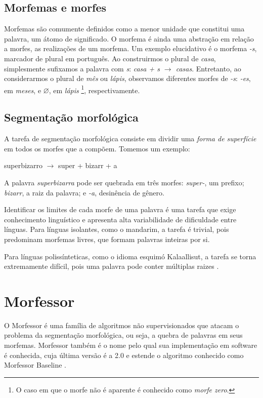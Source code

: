 \documentclass[cic,tc]{iiufrgs}
\begin{document}
\subsection{Morfemas e morfes}
Morfemas são comumente definidos como a menor unidade que constitui uma palavra, um átomo de significado. O morfema é ainda uma abstração em relação a morfes, as realizações de um morfema. Um exemplo elucidativo é o morfema \emph{-s}, marcador de plural em português. Ao construirmos o plural de \emph{casa}, simplesmente sufixamos a palavra com \emph{s}: \emph{casa + s $\rightarrow$ casas}. Entretanto, ao considerarmos o plural de \emph{mês} ou \emph{lápis}, observamos diferentes morfes de \emph{-s}: \emph{-es}, em \emph{meses}, e $\varnothing$, em \emph{lápis} \footnote{O caso em que o morfe não é aparente é conhecido como \emph{morfe zero}.}, respectivamente.

\subsection{Segmentação morfológica}
A tarefa de segmentação morfológica consiste em dividir uma \emph{forma de superfície} em todos os morfes que a compõem. Tomemos um exemplo:

\begin{center}
    superbizarro $\rightarrow$ super + bizarr + a
\end{center}

A palavra \emph{superbizarra} pode ser quebrada em três morfes: \emph{super-}, um prefixo; \emph{bizarr}, a raiz da palavra; e \emph{-a}, desinência de gênero.

Identificar os limites de cada morfe de uma palavra é uma tarefa que exige conhecimento linguístico e apresenta alta variabilidade de dificuldade entre línguas. Para línguas isolantes, como o mandarim, a tarefa é trivial, pois predominam morfemas livres, que formam palavras inteiras por si.

Para línguas polissínteticas, como o idioma esquimó Kalaallisut, a tarefa se torna extremamente difícil, pois uma palavra pode conter múltiplas raizes \cite{morph-typology}.


\section{Morfessor}
O Morfessor \cite{creutz-lagus-2002-unsupervised,Creutz04inductionof,Creutz05inducingthe,Creutz05unsupervisedmorpheme,creutz-lagus-2007-unsupervised} é uma família de algoritmos não supervisionados que atacam o problema da segmentação morfológica, ou seja, a quebra de palavras em seus morfemas. Morfessor também é o nome pelo qual sua implementação em software é conhecida, cuja última versão é a 2.0 \cite{Virpioja2013Morfessor2P} e estende o algoritmo conhecido como Morfessor Baseline \cite{creutz-lagus-2002-unsupervised, Creutz05unsupervisedmorpheme}.
\end{document}
